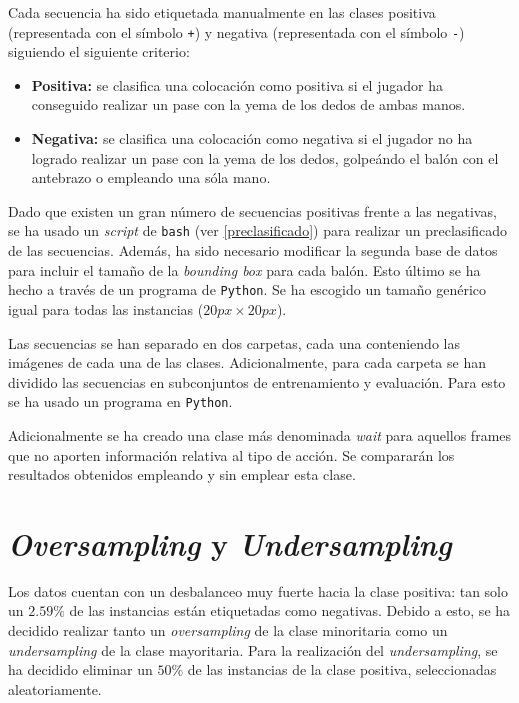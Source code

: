 \documentclass[12pt]{report} %
\begin{document}
    Cada secuencia ha sido etiquetada manualmente en las clases positiva
    (representada con el símbolo \verb!+!) y negativa (representada con el
    símbolo \verb!-!) siguiendo el siguiente criterio:
    \begin{itemize}
        \item \textbf{Positiva:} se clasifica una colocación como positiva si
        el jugador ha conseguido realizar un pase con la yema de los dedos de
        ambas manos.
        \item \textbf{Negativa:} se clasifica una colocación como negativa si
        el jugador no ha logrado realizar un pase con la yema de los dedos,
        golpeándo el balón con el antebrazo o empleando una sóla mano.
    \end{itemize}
    
    Dado que existen un gran número de secuencias positivas frente a las
    negativas, se ha usado un \textit{script} de \texttt{bash} (ver
    \ref{preclasificado}) para realizar un preclasificado de las secuencias.
    Además, ha sido necesario modificar la segunda base de datos para incluir
    el tamaño de la \textit{bounding box} para cada balón. Esto último se ha
    hecho a través de un programa de \texttt{Python}. Se ha escogido un 
    tamaño genérico igual para todas las instancias ($20px\times20px$).

    Las secuencias se han separado en dos carpetas, cada una conteniendo las
    imágenes de cada una de las clases. Adicionalmente, para cada carpeta se
    han dividido las secuencias en subconjuntos de entrenamiento y evaluación.
    Para esto se ha usado un programa en \texttt{Python}.

    Adicionalmente se ha creado una clase más denominada \textit{wait} para
    aquellos frames que no aporten información relativa al tipo de acción. Se
    compararán los resultados obtenidos empleando y sin emplear esta clase.

    \section{\textit{Oversampling} y \textit{Undersampling}}

    Los datos cuentan con un desbalanceo muy fuerte hacia la clase positiva: tan
    solo un $2.59\%$ de las instancias están etiquetadas como negativas. Debido
    a esto, se ha decidido realizar tanto un \textit{oversampling} de la clase
    minoritaria como un \textit{undersampling} de la clase mayoritaria. Para la
    realización del \textit{undersampling}, se ha decidido eliminar un $50\%$ de
    las instancias de la clase positiva, seleccionadas aleatoriamente.
\end{document}

